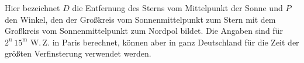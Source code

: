 Hier bezeichnet $D$ die Entfernung des Sterns vom Mittelpunkt der Sonne und $P$ den Winkel, den der Großkreis vom Sonnenmittelpunkt zum Stern mit dem Großkreis vom Sonnenmittelpunkt zum Nordpol bildet. Die Angaben sind für $2^{\mathrm u}\ 15^{\mathrm m}$ W.\,Z. in Paris berechnet, können aber in ganz Deutschland für die Zeit der größten Verfinsterung verwendet werden.
\par\clearpage
